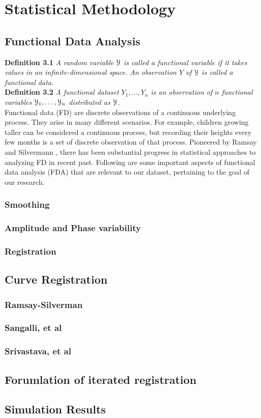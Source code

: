 \chapter{Statistical Methodology}

\section{Functional Data Analysis}
\noindent
{\bf{Definition 3.1}} {\emph{A random variable $\mathcal{Y}$ is called a functional variable if it takes values in an infinite-dimensional space. An observation $Y$ of $\mathcal{Y}$ is called a functional data. \cite{Ferraty_Vieu_2006_Nonparametric}}}\\
\noindent
{\bf{Definition 3.2}} {\emph{A functional dataset $Y_1, \dots, Y_n$ is an observation of $n$ functional variables $\mathcal{Y}_1, \dots, \mathcal{Y}_n$ distributed as $\mathcal{Y}$.}}\\

Functional data (FD) are discrete observations of a continuous underlying process. They arise in many different scenarios. For example, children growing taller can be considered a continuous process, but recording their heights every few months is a set of discrete observation of that process. Pioneered by Ramsay and Silvermann \cite{Ramsay_2006_Functional}, there has been substantial progress in statistical approaches to analyzing FD in recent past. Following are some important aspects of functional data analysis (FDA) that are relevant to our dataset, pertaining to the goal of our research. 

\subsection{Smoothing}

\subsection{Amplitude and Phase variability}

\subsection{Registration}

\section{Curve Registration}
\subsection{Ramsay-Silverman}
\subsection{Sangalli, et al}
\subsection{Srivastava, et al}

\section{Forumlation of iterated registration}

\section{Simulation Results}


